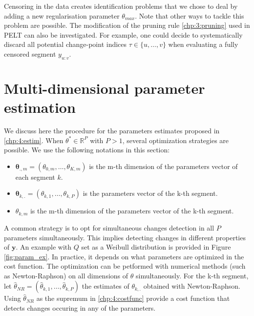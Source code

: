 Censoring in the data creates identification problems that we chose to deal by adding a new regularisation parameter $\theta_{max}$. Note that other ways to tackle this problem are possible. The modification of the pruning rule \ref{chp:3:pruning} used in PELT can also be investigated. For example, one could decide to systematically discard all potential change-point indices $\tau \in \{u,\dots,v\}$ when evaluating a fully censored segment $y_{u:v}$.  

\section{Multi-dimensional parameter estimation}\label{chp:4:3}

We discuss here the procedure for the parameters estimates proposed in \ref{chp:4:estim}. When $\theta^* \in \mathbb{R}^P$ with $P > 1$, several optimization strategies are possible. We use the following notations in this section: 
\begin{itemize}
\item $\bm \theta_{.,m} = (\theta_{0,m},\dots,\theta_{K,m})$ is the m-th dimension of the parameters vector of each segment $k$.
\item $\bm \theta_{k,.} = (\theta_{k,1},\dots,\theta_{k,P})$ is the parameters vector of the k-th segment.
\item $\theta_{k,m}$ is the m-th dimension of the parameters vector of the k-th segment.
\end{itemize}

A common strategy is to opt for simultaneous changes detection in all $P$ parameters simultaneously. This implies detecting changes in different properties of $\bm y$. An example with $Q$ set as a Weibull distribution is provided in Figure \ref{fig:param_ex}. In practice, it depends on what parameters are optimized in the cost function. The optimization can be petformed with numerical methods (such as Newton-Raphson) on all dimensions of $\theta$ simultaneously. For the k-th segment, let $\widehat{\theta}_{NR} = (\widehat{\theta}_{k,1},\dots,\widehat{\theta}_{k,P})$ the estimates of $\theta_{k,.}$ obtained with Newton-Raphson. Using $\widehat{\theta}_{NR}$ as the supremum in \ref{chp:4:costfunc} provide a cost function that detects changes occuring in any of the parameters.  

